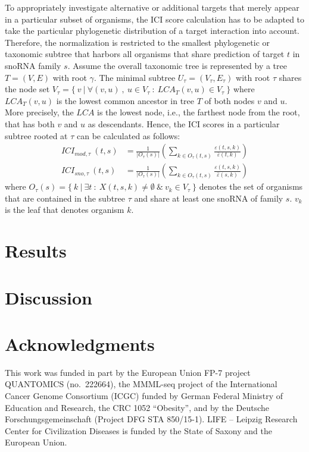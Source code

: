 \documentclass[preprint,3p,times,twocolumn]{elsarticle}
\begin{document}
To appropriately investigate alternative or additional targets that
merely appear in a particular subset of organisms, the ICI score
calculation has to be adapted to take the particular phylogenetic
distribution of a target interaction into account. Therefore, the
normalization is restricted to the smallest phylogenetic or taxonomic
subtree that harbors all organisms that share prediction of target
$t$ in snoRNA family $s$.  Assume the overall taxonomic tree is
represented by a tree $T=(V,E)$ with root $\gamma$. The minimal
subtree $U_\tau = (V_\tau, E_\tau)$ with root $\tau$ shares the node
set
$V_\tau = \{\ v\ |\ \forall (v,u)\ ,\ u \in V_\tau\ :\ LCA_T(v,u) \in
V_\tau\ \}$ where $LCA_T(v,u)$ is the lowest common ancestor in tree
$T$ of both nodes $v$ and $u$. More precisely, the $LCA$ is the lowest
node, i.e., the farthest node from the root, that has both $v$ and $u$
as descendants.  Hence, the ICI scores in a particular subtree rooted
at $\tau$ can be calculated as follows:
\begin{equation}
  \begin{split}
    ICI_{mod,\tau}\:(t,s) & = \frac{1}{|O_\tau(s)|}  \left( \sum_{k\in O_\tau(t,s)} \frac{\varepsilon(t,s,k)}{\bar\varepsilon(t,k)} \right)
    \\
    ICI_{sno,\tau}\:(t,s) & = \frac{1}{|O_\tau(s)|}  \left( \sum_{k\in O_\tau(t,s)} \frac{\varepsilon(t,s,k)}{\hat\varepsilon(s,k)} \right)
  \end{split}
\end{equation}
where
$O_\tau(s) = \{\ k\ |\ \exists t\ :\ X(t,s,k) \ne \emptyset\ \&\ v_k
\in V_\tau\ \}$ denotes the set of organisms that are contained in the
subtree $\tau$ and share at least one snoRNA of family $s$. $v_k$ is
the leaf that denotes organism $k$.



\section{Results}


\section{Discussion}



\section*{Acknowledgments}

This work was funded in part by the European Union FP-7 project QUANTOMICS
(no.\ 222664), the MMML-seq project of the International Cancer Genome
Consortium (ICGC) funded by German Federal Ministry of Education and
Research, the CRC 1052 ``Obesity'', and by the Deutsche
Forschungsgemeinschaft (Project DFG STA 850/15-1). LIFE -- Leipzig Research
Center for Civilization Diseases is funded by the State of Saxony and the
European Union.



\end{document}

